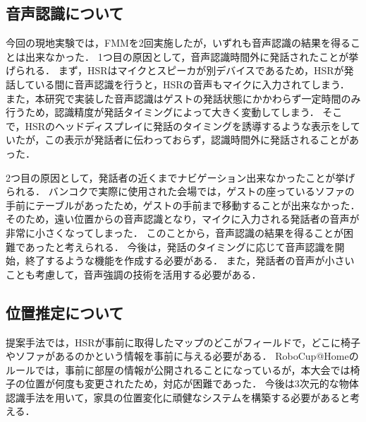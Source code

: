 \documentclass[a4j]{jarticle}
\begin{document}
\subsection{音声認識について}
今回の現地実験では，FMMを2回実施したが，いずれも音声認識の結果を得ることは出来なかった．
1つ目の原因として，音声認識時間外に発話されたことが挙げられる．
まず，HSRはマイクとスピーカが別デバイスであるため，HSRが発話している間に音声認識を行うと，HSRの音声もマイクに入力されてしまう．
また，本研究で実装した音声認識はゲストの発話状態にかかわらず一定時間のみ行うため，認識精度が発話タイミングによって大きく変動してしまう．
そこで，HSRのヘッドディスプレイに発話のタイミングを誘導するような表示をしていたが，この表示が発話者に伝わっておらず，認識時間外に発話されることがあった．

2つ目の原因として，発話者の近くまでナビゲーション出来なかったことが挙げられる．
バンコクで実際に使用された会場では，ゲストの座っているソファの手前にテーブルがあったため，ゲストの手前まで移動することが出来なかった．
そのため，遠い位置からの音声認識となり，マイクに入力される発話者の音声が非常に小さくなってしまった．
このことから，音声認識の結果を得ることが困難であったと考えられる．
今後は，発話のタイミングに応じて音声認識を開始，終了するような機能を作成する必要がある．
また，発話者の音声が小さいことも考慮して，音声強調\cite{voice_enhancement_1, voice_enhancement_2}の技術を活用する必要がある．

\subsection{位置推定について}
提案手法では，HSRが事前に取得したマップのどこがフィールドで，どこに椅子やソファがあるのかという情報を事前に与える必要がある．
RoboCup@Homeのルールでは，事前に部屋の情報が公開されることになっているが，本大会では椅子の位置が何度も変更されたため，対応が困難であった．
今後は3次元的な物体認識手法\cite{sun2022onepose}を用いて，家具の位置変化に頑健なシステムを構築する必要があると考える．
\end{document}
